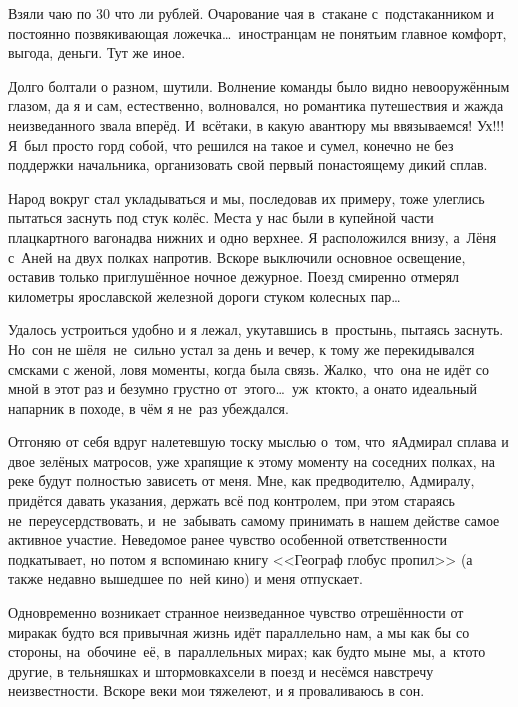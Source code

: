 Взяли чаю по 30 что ли рублей. Очарование чая в~стакане с~подстаканником и постоянно позвякивающая ложечка\ldots~иностранцам не понять\mdash им главное комфорт, выгода, деньги. Тут же иное. 

Долго болтали о разном, шутили. Волнение команды было видно невооружённым глазом, да я и сам, естественно, волновался, но романтика путешествия и жажда неизведанного звала вперёд. И~всё\sdash таки, в какую авантюру мы ввязываемся! Ух!!! Я~был просто горд собой, что решился на такое и сумел, конечно не без поддержки начальника, организовать свой первый по\sdash настоящему дикий сплав. 

Народ вокруг стал укладываться и мы, последовав их примеру, тоже улеглись пытаться заснуть под стук колёс. Места у нас были в купейной части плацкартного вагона\mdash два нижних и одно верхнее. Я расположился внизу, а~Лёня с~Аней на двух полках напротив. Вскоре выключили основное освещение, оставив только приглушённое ночное дежурное. Поезд смиренно отмерял километры ярославской железной дороги стуком колесных пар\ldots

Удалось устроиться удобно и я лежал, укутавшись в~простынь, пытаясь заснуть. Но~сон не шёл\mdash я~не~сильно устал за день и вечер, к тому же перекидывался смс\sdash ками с женой, ловя моменты, когда была связь. Жалко,~что~она не идёт со мной в этот раз и безумно грустно от~этого\ldots~уж~кто\sdash кто, а она\sdash то идеальный напарник в походе, в чём я не~раз убеждался.
 
Отгоняю от себя вдруг налетевшую тоску мыслью о~том, что~я\mdash Адмирал сплава и двое зелёных матросов, уже храпящие к этому моменту на соседних полках, на реке будут полностью зависеть от меня. Мне, как предводителю, Адмиралу, придётся давать указания, держать всё под контролем, при этом стараясь не~переусердствовать, и~не~забывать самому принимать в нашем действе самое активное участие. Неведомое ранее чувство особенной ответственности подкатывает, но потом я вспоминаю книгу <<Географ глобус пропил>> \cite{ГеографГлобусПропил} (а также недавно вышедшее по~ней кино) и меня отпускает. 

Одновременно возникает странное неизведанное чувство отрешённости от мира\mdash как будто вся привычная жизнь идёт параллельно нам, а мы как бы со стороны, на~обочине~её, в~параллельных мирах; как будто мы\mdash не~мы, а~кто\sdash то другие, в тельняшках и штормовках\mdash сели в поезд и несёмся навстречу неизвестности. Вскоре веки мои тяжелеют, и я проваливаюсь в сон.

\begin{center}
\end{center}